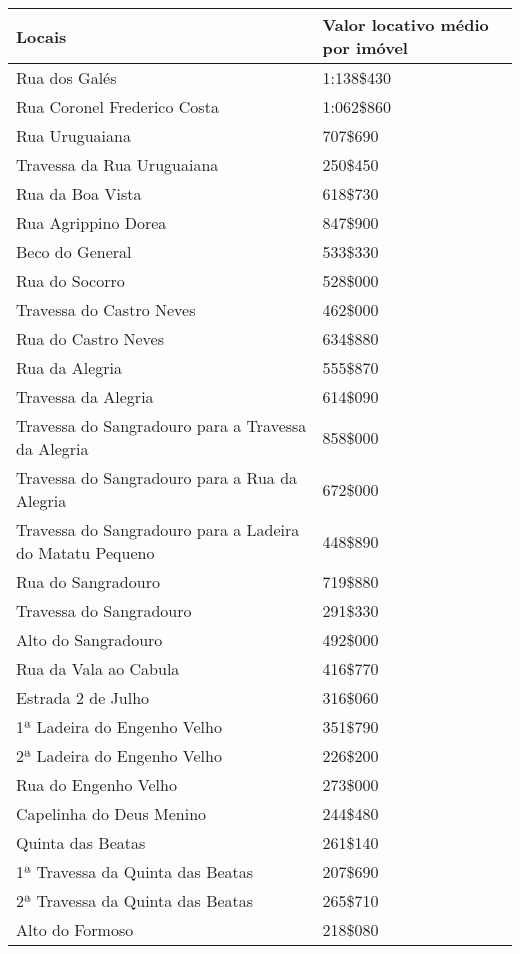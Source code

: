 \begin{table}[!htp]
{
\begin{tiny}
\begin{tabular}{ll}
\toprule
Locais	&Valor locativo médio por imóvel\\
\midrule
\midrule
Rua dos Galés	&1:138\$430\\
Rua Coronel Frederico Costa	&1:062\$860\\
Rua Uruguaiana	&707\$690\\
Travessa da Rua Uruguaiana	&250\$450\\
Rua da Boa Vista	&618\$730\\
Rua Agrippino Dorea	&847\$900\\
Beco do General	&533\$330\\
Rua do Socorro	&528\$000\\
Travessa do Castro Neves	&462\$000\\
Rua do Castro Neves	&634\$880\\
Rua da Alegria	&555\$870\\
Travessa da Alegria	&614\$090\\
Travessa do Sangradouro para a Travessa da Alegria	&858\$000\\
Travessa do Sangradouro para a Rua da Alegria	&672\$000\\
Travessa do Sangradouro para a Ladeira do Matatu Pequeno	&448\$890\\
Rua do Sangradouro	&719\$880\\
Travessa do Sangradouro	&291\$330\\
Alto do Sangradouro	&492\$000\\
Rua da Vala ao Cabula	&416\$770\\
Estrada 2 de Julho	&316\$060\\
1ª Ladeira do Engenho Velho	&351\$790\\
2ª Ladeira do Engenho Velho	&226\$200\\
Rua do Engenho Velho	&273\$000\\
Capelinha do Deus Menino	&244\$480\\
Quinta das Beatas	&261\$140\\
1ª Travessa da Quinta das Beatas	&207\$690\\
2ª Travessa da Quinta das Beatas	&265\$710\\
Alto do Formoso	&218\$080\\

\end{tabular}
\end{tiny}}
\end{table}
